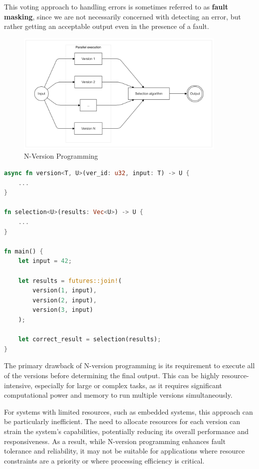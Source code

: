 \documentclass[12pt, letterpaper]{article}
\begin{document}
This voting approach to handling errors is sometimes referred to as \textbf{fault masking}, since we are not necessarily concerned with detecting an error, but rather getting an acceptable output even in the presence of a fault.

\begin{figure}[hbt!]
    \centering
    \includegraphics[width=0.9\textwidth]{n_version_prog/n_version_prog.png}
    \caption{N-Version Programming}
\end{figure}

\begin{lstlisting}[language=Rust]
async fn version<T, U>(ver_id: u32, input: T) -> U {
    ...
}

fn selection<U>(results: Vec<U>) -> U {
    ...
}

fn main() {
    let input = 42; 
    
    let results = futures::join!(
        version(1, input), 
        version(2, input), 
        version(3, input)
    );

    let correct_result = selection(results);
}
\end{lstlisting}

The primary drawback of N-version programming is its requirement to execute all of the versions before determining the final output. This can be highly resource-intensive, especially for large or complex tasks, as it requires significant computational power and memory to run multiple versions simultaneously.

For systems with limited resources, such as embedded systems, this approach can be particularly inefficient. The need to allocate resources for each version can strain the system’s capabilities, potentially reducing its overall performance and responsiveness. As a result, while N-version programming enhances fault tolerance and reliability, it may not be suitable for applications where resource constraints are a priority or where processing efficiency is critical.
\end{document}
